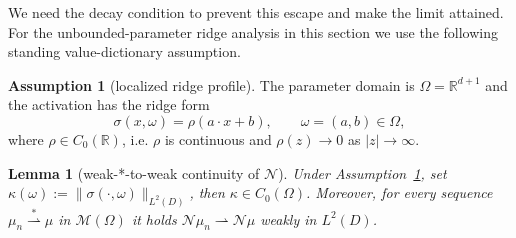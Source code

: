 \documentclass[11pt]{amsart}
\newtheorem{lemma}[theorem]{Lemma}
\theoremstyle{definition}
\newtheorem{assumption}[theorem]{Assumption}
\theoremstyle{remark}
\begin{document}
We need the decay condition to prevent this escape and make the limit attained.
For the unbounded-parameter ridge analysis in this section we use the following
standing value-dictionary assumption.
\begin{assumption}[localized ridge profile]\label{ass:ridge_c0}
The parameter domain is $\Omega = \mathbb{R}^{d+1}$ and the activation has the
ridge form
\begin{equation*}
	\sigma(x,\omega) = \rho(a \cdot x + b),
	\qquad \omega = (a,b) \in \Omega,
\end{equation*}
where $\rho \in C_0(\mathbb{R})$, i.e. $\rho$ is continuous and
$\rho(z) \rightarrow 0$ as $|z| \rightarrow \infty$.
\end{assumption}

\begin{lemma}[weak-*-to-weak continuity of $\mathcal{N}$]\label{lem:value_decay}
Under Assumption~\ref{ass:ridge_c0}, set
$\kappa(\omega) := \|\sigma(\cdot, \omega)\|_{L^2(D)}$, then
$\kappa \in C_0(\Omega)$.
Moreover, for every sequence
$\mu_n \overset{*}{\rightharpoonup} \mu$ in $\mathcal{M}(\Omega)$ it holds
$\mathcal{N}\mu_n \rightharpoonup \mathcal{N}\mu$ weakly in $L^2(D)$.
\end{lemma}
\end{document}
